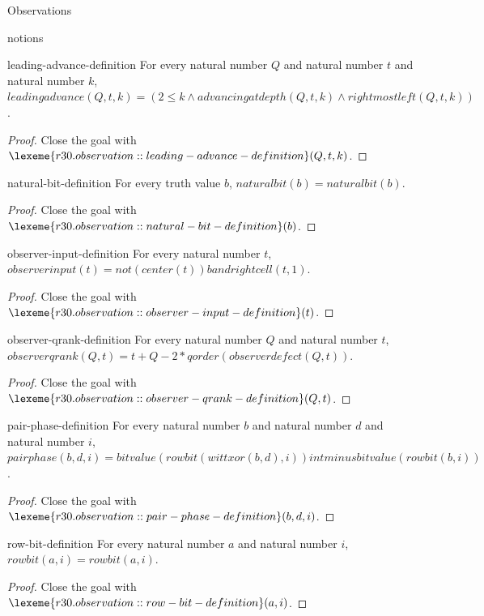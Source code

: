 \begin{lexlean}{Observations}
\begin{section}{notions}
\begin{lemma}{leading-advance-definition}
For every natural number \(Q\) and natural number \(t\) and natural number \(k\), \(leadingadvance(Q, t, k) = (2 ≤ k ∧ advancingatdepth(Q, t, k) ∧ rightmostleft(Q, t, k))\).
\begin{proof}
Close the goal with \(\lexeme{r30.observation::leading-advance-definition}(Q, t, k)\).
\end{proof}
\end{lemma}

\begin{lemma}{natural-bit-definition}
For every truth value \(b\), \(naturalbit(b) = naturalbit(b)\).
\begin{proof}
Close the goal with \(\lexeme{r30.observation::natural-bit-definition}(b)\).
\end{proof}
\end{lemma}

\begin{lemma}{observer-input-definition}
For every natural number \(t\), \(observerinput(t) = not(center(t)) band rightcell(t, 1)\).
\begin{proof}
Close the goal with \(\lexeme{r30.observation::observer-input-definition}(t)\).
\end{proof}
\end{lemma}

\begin{lemma}{observer-qrank-definition}
For every natural number \(Q\) and natural number \(t\), \(observerqrank(Q, t) = t + Q - 2 * qorder(observerdefect(Q, t))\).
\begin{proof}
Close the goal with \(\lexeme{r30.observation::observer-qrank-definition}(Q, t)\).
\end{proof}
\end{lemma}

\begin{lemma}{pair-phase-definition}
For every natural number \(b\) and natural number \(d\) and natural number \(i\), \(pairphase(b, d, i) = bitvalue(rowbit(wittxor(b, d), i)) intminus bitvalue(rowbit(b, i))\).
\begin{proof}
Close the goal with \(\lexeme{r30.observation::pair-phase-definition}(b, d, i)\).
\end{proof}
\end{lemma}

\begin{lemma}{row-bit-definition}
For every natural number \(a\) and natural number \(i\), \(rowbit(a, i) = rowbit(a, i)\).
\begin{proof}
Close the goal with \(\lexeme{r30.observation::row-bit-definition}(a, i)\).
\end{proof}
\end{lemma}


\end{section}
\end{lexlean}
